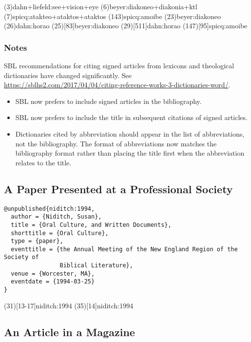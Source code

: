 \documentclass[a4paper]{article}
\begin{document}
\examplecite(3){dahn+liefeld:see+vision+eye}
\examplecite(6){beyer:diakoneo+diakonia+ktl}
\examplecite(7){spicq:atakteo+ataktos+ataktos}
\examplecite(143){spicq:amoibe}
\examplecite(23){beyer:diakoneo}
\examplecite(26){dahn:horao}
\examplecite(25)[83]{beyer:diakoneo}
\examplecite(29)[511]{dahn:horao}
\examplecite(147)[95]{spicq:amoibe}
\exampleabbreviations
\examplebibliography

\subsubsection{Notes}

SBL recommendations for citing signed articles from lexicons and theological
dictionaries have changed significantly. See
\url{https://sblhs2.com/2017/04/04/citing-reference-works-3-dictionaries-word/}. 
\begin{itemize}
  \item SBL now prefers to include signed articles in the bibliography.
  \item SBL now prefers to include the title in subsequent citations of signed
    articles.
  \item Dictionaries cited by abbreviation should appear in the list of
    abbreviations, not the bibliography. The format of abbreviations now
    matches the bibliography format rather than placing the title first when
    the abbreviation relates to the title.
\end{itemize}

\subsection{A Paper Presented at a Professional Society}

\begin{verbatim}
@unpublished{niditch:1994,
  author = {Niditch, Susan},
  title = {Oral Culture, and Written Documents},
  shorttitle = {Oral Culture},
  type = {paper},
  eventtitle = {the Annual Meeting of the New England Region of the Society of
                Biblical Literature},
  venue = {Worcester, MA},
  eventdate = {1994-03-25}
}
\end{verbatim}

\examplecite(31)[13-17]{niditch:1994}
\examplecite(35)[14]{niditch:1994}
\examplebibliography

\subsection{An Article in a Magazine}
\end{document}
